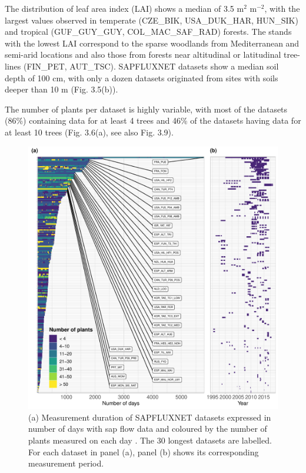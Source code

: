 \documentclass[11pt,twoside]{reedthesis}
\begin{document}
The distribution of leaf area index (LAI) shows a median of 3.5
\(\text{m}^2\) \(\text{m}^{-2}\), with the largest values observed in
temperate (CZE\_BIK, USA\_DUK\_HAR, HUN\_SIK) and tropical
(GUF\_GUY\_GUY, COL\_MAC\_SAF\_RAD) forests. The stands with the lowest
LAI correspond to the sparse woodlands from Mediterranean and semi-arid
locations and also those from forests near altitudinal or latitudinal
tree-lines (FIN\_PET, AUT\_TSC). SAPFLUXNET datasets show a median soil
depth of 100 cm, with only a dozen datasets originated from sites with
soils deeper than 10 m (Fig. 3.5(b)).\par

The number of plants per dataset is highly variable, with most of the
datasets (86\%) containing data for at least 4 trees and 46\% of the
datasets having data for at least 10 trees (Fig. 3.6(a), see also Fig.
3.9). \par

\setlength{\abovecaptionskip}{0pt}
\begin{figure}[hbt!]

{\centering \includegraphics[width=1\linewidth]{figure/CH3/Figure6} 

}

\caption[Duration and number of plants mesured in each dataset.]{(a) Measurement duration of SAPFLUXNET datasets expressed in number of days with sap flow data and coloured by the number of plants measured on each day . The 30 longest datasets are labelled. For each dataset in panel (a), panel (b) shows its corresponding measurement period.}\label{fig:Ch2plot6}
\end{figure}
\end{document}
